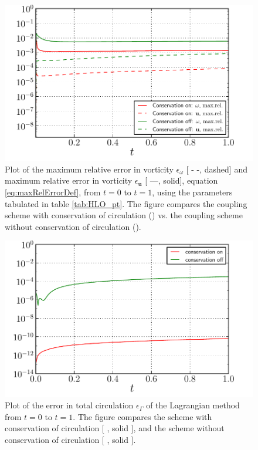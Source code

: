 	\begin{figure}[!p]
	\centering
	\includegraphics[width=0.6\linewidth]{./figures/hybrid/lambOseent2/lambOseen_comparision_conservation_compressed.pdf}
	\caption{Plot of the maximum relative error in vorticity $\epsilon_{\omega}$ [ - -, dashed] and maximum relative error in vorticity $\epsilon_{\mathbf{u}}$ [ ---, solid], equation \ref{eq:maxRelErrorDef}, from $t=0$ to $t=1$, using the parameters tabulated in table \ref{tab:HLO_pt}. The figure compares the coupling scheme with conservation of circulation ({}) vs. the coupling scheme without conservation of circulation ({}).}
	\label{fig:lambOseen_comparision_conservation}
	\end{figure}	

	\begin{figure}[!p]
	\centering
	\includegraphics[width=0.6\linewidth]{./figures/hybrid/lambOseent2/lambOseen_comparision_conservation_circulation_compressed.pdf}
	\caption{Plot of the error in total circulation $\epsilon_{\Gamma}$ of the Lagrangian method from $t=0$ to $t=1$. The figure compares the scheme with conservation of circulation [ {\color{plotRed}{\textbf{---}}}, solid {}], and the scheme without conservation of circulation [ {\color{plotGreen}{\textbf{---}}}, solid {}].}
	\label{fig:lambOseen_comparision_conservation_circulation}
	\end{figure}	

